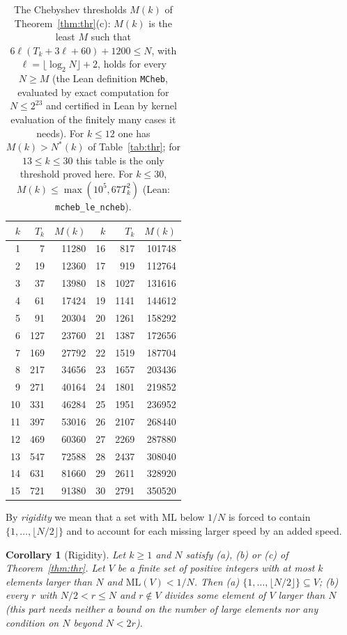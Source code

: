 \documentclass[11pt]{article}
\newtheorem{corollary}[theorem]{Corollary}
\theoremstyle{definition}
\theoremstyle{remark}
\newcommand{\ML}{\mathrm{ML}}
\begin{document}
\begin{table}[ht]
\centering
\small
\begin{tabular}{r r r | r r r}
\toprule
$k$ & $T_k$ & $M(k)$ & $k$ & $T_k$ & $M(k)$ \\
\midrule
1 & 7 & 11280 & 16 & 817 & 101748 \\
2 & 19 & 12360 & 17 & 919 & 112764 \\
3 & 37 & 13980 & 18 & 1027 & 131616 \\
4 & 61 & 17424 & 19 & 1141 & 144612 \\
5 & 91 & 20304 & 20 & 1261 & 158292 \\
6 & 127 & 23760 & 21 & 1387 & 172656 \\
7 & 169 & 27792 & 22 & 1519 & 187704 \\
8 & 217 & 34656 & 23 & 1657 & 203436 \\
9 & 271 & 40164 & 24 & 1801 & 219852 \\
10 & 331 & 46284 & 25 & 1951 & 236952 \\
11 & 397 & 53016 & 26 & 2107 & 268440 \\
12 & 469 & 60360 & 27 & 2269 & 287880 \\
13 & 547 & 72588 & 28 & 2437 & 308040 \\
14 & 631 & 81660 & 29 & 2611 & 328920 \\
15 & 721 & 91380 & 30 & 2791 & 350520 \\
\bottomrule
\end{tabular}
\caption{The Chebyshev thresholds $M(k)$ of Theorem~\ref{thm:thr}(c): $M(k)$ is the least $M$ such that $6\ell(T_k+3\ell+60)+1200\le N$, with $\ell=\lfloor\log_2N\rfloor+2$, holds for every $N\ge M$ (the Lean definition \texttt{MCheb}, evaluated by exact computation for $N\le2^{23}$ and certified in Lean by kernel evaluation of the finitely many cases it needs). For $k\le12$ one has $M(k)>N^*(k)$ of Table~\ref{tab:thr}; for $13\le k\le30$ this table is the only threshold proved here. For $k\le30$, $M(k)\le\max(10^5,67T_k^2)$ (Lean: \texttt{mcheb\_le\_ncheb}).}
\label{tab:cheb}
\end{table}

By \emph{rigidity} we mean that a set with $\ML$ below $1/N$ is forced to contain $\{1,\dots,\lfloor N/2\rfloor\}$ and to account for each missing larger speed by an added speed.
\begin{corollary}[Rigidity]\label{cor:S}
Let $k\ge1$ and $N$ satisfy (a), (b) or (c) of Theorem~\ref{thm:thr}. Let $V$ be a finite set of positive integers with at most $k$ elements larger than $N$ and $\ML(V)<1/N$. Then (a) $\{1,\dots,\lfloor N/2\rfloor\}\subseteq V$; (b) every $r$ with $N/2<r\le N$ and $r\notin V$ divides some element of $V$ larger than $N$ (this part needs neither a bound on the number of large elements nor any condition on $N$ beyond $N<2r$).
\end{corollary}
\end{document}
